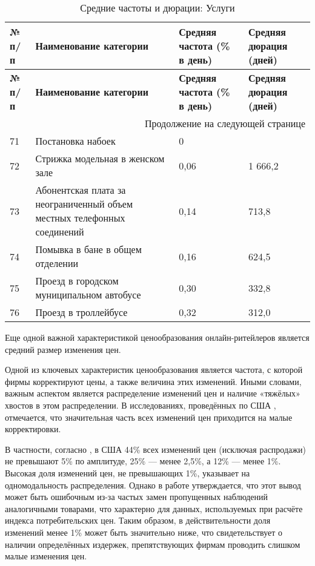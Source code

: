 \begin{longtable}{|p{1cm}|p{8.5cm}|p{3.5cm}|p{3cm}|} %
	\caption{Средние частоты и дюрации: Услуги}
	\label{tab:services} \\
	\hline
	\textbf{№ п/п} & \textbf{Наименование категории} & \textbf{Средняя частота (\% в день)} & \textbf{Средняя дюрация (дней)} \\
	\hline
	\hline
	\endfirsthead
	
	\hline
	\textbf{№ п/п} & \textbf{Наименование категории} & \textbf{Средняя частота (\% в день)} & \textbf{Средняя дюрация (дней)} \\
	\hline
	\hline
	\endhead
	
	\hline
	\multicolumn{4}{r}{Продолжение на следующей странице} \\
	\hline
	\endfoot
	
	\hline
	\endlastfoot
	
	71 & Постановка набоек & 0 &  \\ \hline
	72 & Стрижка модельная в женском зале & 0,06 & 1 666,2 \\ \hline
	73 & Абонентская плата за неограниченный объем местных телефонных соединений & 0,14 & 713,8 \\ \hline
	74 & Помывка в бане в общем отделении & 0,16 & 624,5 \\ \hline
	75 & Проезд в городском муниципальном автобусе & 0,30 & 332,8 \\ \hline
	76 & Проезд в троллейбусе & 0,32 & 312,0 \\ \hline
	
\end{longtable}


Еще одной важной характеристикой ценообразования онлайн-ритейлеров является средний размер изменения цен. 

Одной из ключевых характеристик ценообразования является частота, с которой фирмы корректируют цены, а также величина этих изменений. Иными словами, важным аспектом является распределение изменений цен и наличие «тяжёлых» хвостов в этом распределении. В исследованиях, проведённых по США \cite{KlenowMalin2010, Midrigan2011}, отмечается, что значительная часть всех изменений цен приходится на малые корректировки.

В частности, согласно \cite{KlenowKryvtsov2008}, в США 44\% всех изменений цен (исключая распродажи) не превышают 5\% по амплитуде, 25\% — менее 2,5\%, а 12\% — менее 1\%. Высокая доля изменений цен, не превышающих 1\%, указывает на одномодальность распределения. Однако в работе \cite{cavallo2018scraped} утверждается, что этот вывод может быть ошибочным из-за частых замен пропущенных наблюдений аналогичными товарами, что характерно для данных, используемых при расчёте индекса потребительских цен. Таким образом, в действительности доля изменений менее 1\% может быть значительно ниже, что свидетельствует о наличии определённых издержек, препятствующих фирмам проводить слишком малые изменения цен.


